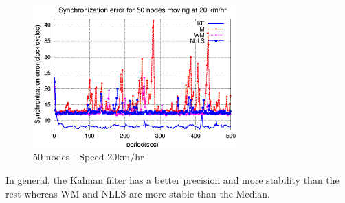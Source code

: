 \documentclass[a4paper,10pt]{report}
\begin{document}
\begin{figure}
\centering
\includegraphics[width=0.7\textwidth]{50output-s20}
\caption{50 nodes - Speed 20km/hr} \label{50output20}
\end{figure}
In general, the Kalman filter has a better precision and more stability than the rest whereas WM and NLLS are more stable than the Median.
\end{document}

